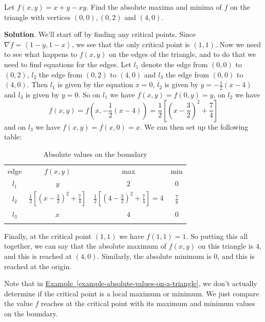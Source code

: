 \documentclass[10pt,]{book}
\theoremstyle{ptxplainnotitle}
\theoremstyle{ptxplaintitle}
\theoremstyle{ptxplainnotitle}
\theoremstyle{ptxplaintitle}
\theoremstyle{ptxplainnotitle}
\theoremstyle{ptxplaintitle}
\theoremstyle{ptxdefinitionnotitle}
\theoremstyle{ptxdefinitiontitle}
\theoremstyle{ptxdefinitionnotitle}
\theoremstyle{ptxdefinitiontitle}
\theoremstyle{ptxdefinitionnotitle}
\theoremstyle{ptxdefinitiontitle}
\theoremstyle{ptxdefinitionnotitle}
\theoremstyle{ptxdefinitiontitle}
\theoremstyle{ptxdefinitionnotitle}
\theoremstyle{ptxdefinitiontitle}
\numberwithin{equation}{section}
\newcommand{\hrulethin}  {\noalign{\hrule height 0.04em}}
\newcommand{\hrulethick} {\noalign{\hrule height 0.11em}}
\newcommand{\grad}{\nabla}
\newcommand{\dotprod}[1]{\left\langle #1 \right\rangle}
\begin{document}
\begin{example}\label{example-absolute-values-on-a-triangle}
\hypertarget{p-1089}{}%
Let \(f(x,y) = x + y - xy\). Find the absolute maxima and minima of \(f\) on the triangle with vertices \((0,0), (0,2)\) and \((4,0)\).%
\par\smallskip%
\noindent\textbf{Solution}.\hypertarget{solution-171}{}\quad%
\hypertarget{p-1090}{}%
We'll start off by finding any critical points. Since \(\grad f = \dotprod{1-y, 1-x}\), we see that the only critical point is \((1,1)\). Now we need to see what happens to \(f(x,y)\) on the edges of the triangle, and to do that we need to find equations for the edges. Let \(l_{1}\) denote the edge from \((0,0)\) to \((0,2)\), \(l_{2}\) the edge from \((0,2)\) to \((4,0)\) and \(l_{3}\) the edge from \((0,0)\) to \((4,0)\). Then \(l_{1}\) is given by the equation \(x = 0\), \(l_{2}\) is given by \(y = -\frac{1}{2}(x-4)\) and \(l_{3}\) is given by \(y = 0\). So on \(l_{1}\) we have \(f(x,y) = f(0,y) = y\), on \(l_{2}\) we have%
\begin{equation*}
f(x,y) = f\left(x,-\frac{1}{2}(x-4)\right) = \frac{1}{2}\left[\left(x-\frac{3}{2}\right)^{2} + \frac{7}{4}\right]
\end{equation*}
and on \(l_{3}\) we have \(f(x,y) = f(x,0) = x\). We can then set up the following table:%
\begin{table}
\centering
\begin{tabular}{cccc}\hrulethick
edge&\(f(x,y)\)&max&min\tabularnewline\hrulethin
\(l_{1}\)&\(y\)&\(2\)&\(0\)\tabularnewline[0pt]
\(l_{2}\)&\(\frac{1}{2}\left[\left(x-\frac{3}{2}\right)^{2} + \frac{7}{4}\right]\)&\(\frac{1}{2}\left[\left(4-\frac{3}{2}\right)^{2} + \frac{7}{4}\right] = 4\)&\(\frac{7}{8}\)\tabularnewline[0pt]
\(l_{3}\)&\(x\)&\(4\)&\(0\)\tabularnewline\hrulethick
\end{tabular}
\caption{Absolute values on the boundary\label{table-triangle-extrema}}
\end{table}
\hypertarget{p-1091}{}%
Finally, at the critical point \((1,1)\) we have \(f(1,1) = 1\). So putting this all together, we can say that the absolute maximum of \(f(x,y)\) on this triangle is \(4\), and this is reached at \((4,0)\). Similarly, the absolute minimum is \(0\), and this is reached at the origin.%
\end{example}
\hypertarget{p-1092}{}%
Note that in \hyperref[example-absolute-values-on-a-triangle]{Example~\ref{example-absolute-values-on-a-triangle}}, we don't actually determine if the critical point is a local maximum or minimum. We just compare the value \(f\) reaches at the critical point with its maximum and minimum values on the boundary.%
\end{document}
